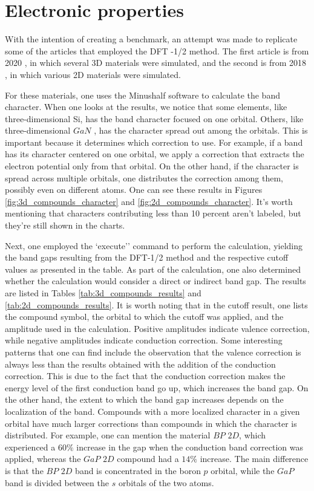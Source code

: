 \FloatBarrier
\section{Electronic properties}

With the intention of creating a benchmark, an attempt was made to replicate some of the articles that employed the DFT -1/2 method. The first article is from 2020 \cite{Matusalem_2020}, in which several 3D materials were simulated, and the second is from 2018 \cite{PhysRevB.97.045426}, in which various 2D materials were simulated.

For these materials, one uses the Minushalf software to calculate the band character. When one looks at the results, we notice that some elements, like three-dimensional Si, has the band character focused on one orbital. Others, like three-dimensional $GaN$ , has the character spread out among the orbitals. This is important because it determines which correction to use. For example, if a band has its character centered on one orbital, we apply a correction that extracts the electron potential only from that orbital. On the other hand, if the character is spread across multiple orbitals, one distributes the correction among them, possibly even on different atoms. One can see these results in Figures \ref{fig:3d_compounds_character} and \ref{fig:2d_compounds_character}. It's worth mentioning that characters contributing less than 10 percent aren't labeled, but they're still shown in the charts.

Next, one employed the `execute'' command to perform the calculation, yielding the band gaps resulting from the DFT-1/2 method and the respective cutoff values as presented in the table. As part of the calculation, one also determined whether the calculation would consider a direct or indirect band gap. The results are listed in Tables \ref{tab:3d_compounds_results} and \ref{tab:2d_compounds_results}. It is worth noting that in the cutoff result, one lists the compound symbol, the orbital to which the cutoff was applied, and the amplitude used in the calculation. Positive amplitudes indicate valence correction, while negative amplitudes indicate conduction correction. Some interesting patterns that one can find include the observation that the valence correction is always less than the results obtained with the addition of the conduction correction. This is due to the fact that the conduction correction makes the energy level of the first conduction band go up, which increases the band gap. On the other hand, the extent to which the band gap increases depends on the localization of the band. Compounds with a more localized character in a given orbital have much larger corrections than compounds in which the character is distributed. For example, one can mention the material $BP$ $2D$, which experienced a $60\%$ increase in the gap when the conduction band correction was applied, whereas the $GaP$ $2D$ compound had a $14\%$ increase. The main difference is that the $BP$ $2D$ band is concentrated in the boron $p$ orbital, while the $GaP$ band is divided between the $s$ orbitals of the two atoms.

